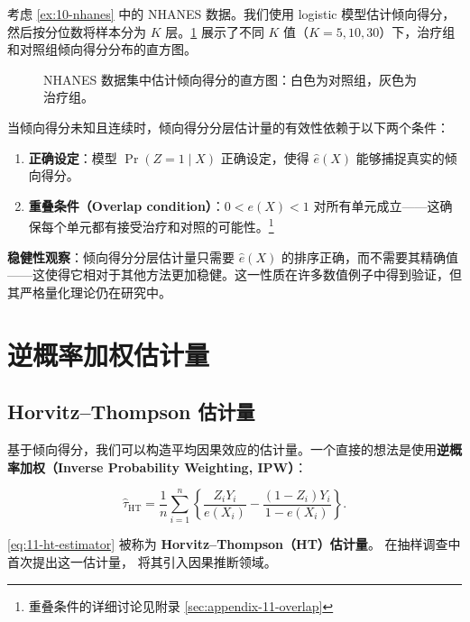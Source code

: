 \begin{Example}\label{ex:11-nhanes-ps}
考虑 \cref{ex:10-nhanes} 中的 NHANES 数据。我们使用 logistic 模型估计倾向得分，然后按分位数将样本分为 $K$ 层。\cref{fig:11-propensity-histograms} 展示了不同 $K$ 值（$K=5, 10, 30$）下，治疗组和对照组倾向得分分布的直方图。
\end{Example}

\begin{figure}[htbp]
\centering
\caption{NHANES 数据集中估计倾向得分的直方图：白色为对照组，灰色为治疗组。}\label{fig:11-propensity-histograms}
\end{figure}

当倾向得分未知且连续时，倾向得分分层估计量的有效性依赖于以下两个条件：

\begin{enumerate}
  \item \textbf{正确设定}：模型 $\Pr(Z=1 \mid X)$ 正确设定，使得 $\hat{e}(X)$ 能够捕捉真实的倾向得分。
  \item \textbf{重叠条件（Overlap condition）}：$0 < e(X) < 1$ 对所有单元成立——这确保每个单元都有接受治疗和对照的可能性。\footnote{重叠条件的详细讨论见附录 \cref{sec:appendix-11-overlap}}
\end{enumerate}

\textbf{稳健性观察}：倾向得分分层估计量只需要 $\hat{e}(X)$ 的排序正确，而不需要其精确值——这使得它相对于其他方法更加稳健。这一性质在许多数值例子中得到验证，但其严格量化理论仍在研究中。

\section{逆概率加权估计量}\label{sec:11-ipw}

\subsection{Horvitz--Thompson 估计量}\label{sec:11-ht-estimator}

基于倾向得分，我们可以构造平均因果效应的估计量。一个直接的想法是使用\textbf{逆概率加权（Inverse Probability Weighting, IPW）}：

\[
\hat\tau_{\text{HT}} = \frac{1}{n} \sum_{i=1}^n \left\{ \frac{Z_i Y_i}{e(X_i)} - \frac{(1-Z_i) Y_i}{1-e(X_i)} \right\} .
\label{eq:11-ht-estimator}
\]

\cref{eq:11-ht-estimator} 被称为 \textbf{Horvitz--Thompson（HT）估计量}。\citet{HorvitzThompson:1952} 在抽样调查中首次提出这一估计量，\citet{Rosenbaum:1987} 将其引入因果推断领域。

